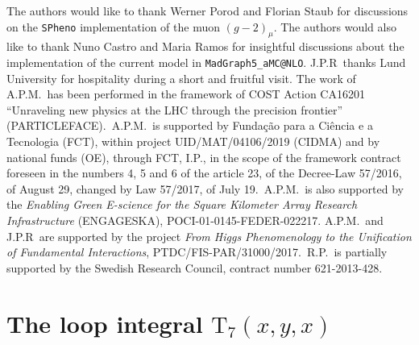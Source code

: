 \documentclass[a4paper,11pt]{article}
\renewcommand{\(}{\left(}
\renewcommand{\)}{\right)}
\renewcommand{\[}{\left[}
\renewcommand{\]}{\right]}
\newcommand{\ro}[1]{\textrm{#1}}
\begin{document}
The authors would like to thank Werner Porod and Florian Staub for discussions on 
the \texttt{SPheno} implementation of the muon $(g-2)_{\mu}$. The authors would also like to thank Nuno Castro and Maria Ramos for insightful discussions about the implementation of the current model in \texttt{MadGraph5\_aMC@NLO}. J.P.R~thanks Lund University for hospitality during a short and fruitful visit. The work of
A.P.M.~has been performed in the framework of COST Action CA16201
``Unraveling new physics at the LHC through the precision frontier'' 
(PARTICLEFACE).~A.P.M.~is supported by Funda\c{c}\~ao para a Ci\^encia 
e a Tecnologia (FCT), within project UID/MAT/04106/2019 (CIDMA) and 
by national funds (OE), through FCT, I.P., in the scope
of the framework contract foreseen in the numbers 4, 5 and 6
of the article 23, of the Decree-Law 57/2016, of August 29,
changed by Law 57/2017, of July 19.~A.P.M.~is also supported by 
the \textit{Enabling Green E-science for the Square Kilometer Array 
Research Infrastructure} (ENGAGESKA), POCI-01-0145-FEDER-022217. A.P.M.~and J.P.R~are supported by the project \textit{From Higgs Phenomenology to the Unification of 
Fundamental Interactions}, PTDC/FIS-PAR/31000/2017.~R.P.~is partially 
supported by the Swedish Research Council, contract number 621-2013-428.

\appendix

\section{The loop integral $\ro{T}_7(x,y,x)$}
\label{app:T7}
\end{document}
